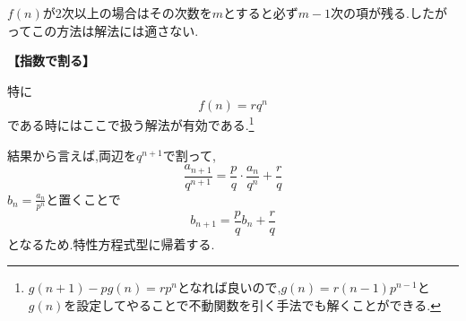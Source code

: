   $f(n)$が2次以上の場合はその次数を$m$とすると必ず$m-1$次の項が残る.したがってこの方法は解法には適さない.
  
\noindent \textbf{【指数で割る】}

  特に
  \[
    f(n)=rq^n
  \]
  である時にはここで扱う解法が有効である.\footnote{$g(n+1)-pg(n)=rp^n$となれば良いので,$g(n)=r(n-1)p^{n-1}$と$g(n)$を設定してやることで不動関数を引く手法でも解くことができる.}
  
   結果から言えば,両辺を$q^{n+1}$で割って,
   \[
      \frac{a_{n+1}}{q^{n+1}}=\frac{p}{q}\cdot\frac{a_n}{q^n}+\frac{r}{q}
   \]
   $b_n=\frac{a_n}{p^n}$と置くことで
   \[
      b_{n+1}=\frac{p}{q}b_n+\frac{r}{q}
   \]
   となるため.特性方程式型に帰着する.
